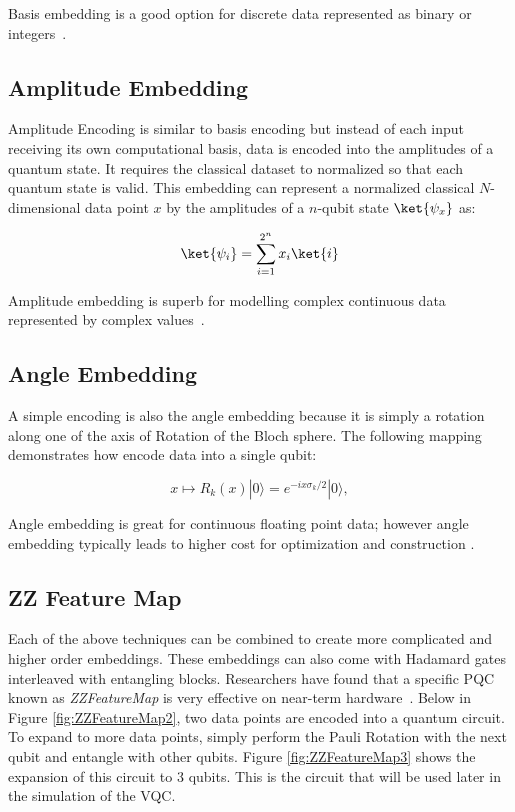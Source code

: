 \documentclass[11pt]{article}
\begin{document}
Basis embedding is a good option for discrete data represented as binary or integers~\cite{pennylaneBLOG}.

\subsection*{Amplitude Embedding}

Amplitude Encoding is similar to basis encoding but instead of each input receiving its own computational basis, data is encoded into
the amplitudes of a quantum state. It requires the classical dataset to normalized so that each quantum state is valid. This embedding
can represent a normalized classical $N$-dimensional data point $x$ by the amplitudes of a $n$-qubit state $\ket{\psi_x}$ as:~\cite{pennylaneQE}

\[
    \ket{\psi_i} = \sum_{i=1}^{2^{n}}x_i\ket{i}
\]

Amplitude embedding is superb for modelling complex continuous data represented by complex values~\cite{pennylaneBLOG}.

\subsection*{Angle Embedding}
A simple encoding is also the angle embedding because it is simply a rotation along one of the axis of Rotation of the Bloch sphere. 
The following mapping demonstrates how encode data into a single qubit:

\[
    x \mapsto R_{k}(x)|0\rangle = e^{-i x\sigma_{k}/2}|0\rangle,    
\]

Angle embedding is great for continuous floating point data; however angle embedding typically leads to higher cost for optimization and construction \cite{pennylaneBLOG}.

\subsection*{ZZ Feature Map}\label{zzfeaturemapsection}

Each of the above techniques can be combined to create more complicated and higher order embeddings. These embeddings can also come with Hadamard gates interleaved
with entangling blocks. 
Researchers have found that a specific PQC known as \textit{ZZFeatureMap} is very effective on near-term hardware~\cite{Havl_ek_2019}. Below in Figure \ref{fig:ZZFeatureMap2}, two data points
are encoded into a quantum circuit. To expand to more data points, simply perform the Pauli Rotation with the next qubit and entangle with other qubits. 
Figure \ref{fig:ZZFeatureMap3} shows the expansion of this circuit to 3 qubits. This is the circuit that will be used later in the simulation of the VQC.
\end{document}
